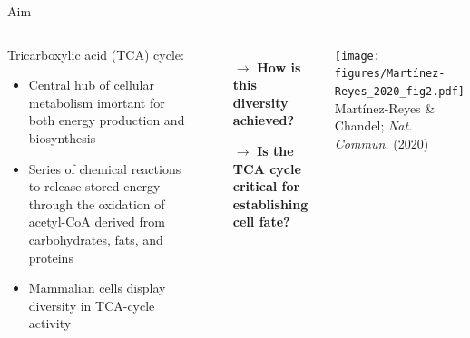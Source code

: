 \documentclass[10pt, aspectratio=169]{beamer}
\begin{document}
\begin{frame}{Aim}
\begin{columns}

\begin{block}{\centering Tricarboxylic acid (TCA) cycle:}
\vspace{0.2cm}
    \begin{itemize}
        \item Central hub of cellular metabolism imortant for both energy production and biosynthesis \\[0.2cm]
        \item Series of chemical reactions to release stored energy through the oxidation of acetyl-CoA derived from carbohydrates, fats, and proteins\\[0.2cm]
        \item Mammalian cells display diversity in TCA-cycle activity \\[0.2cm]
    \end{itemize}
\vspace{0.2cm}
\end{block}

\vspace{0.3cm}

\pause
\begin{itemize}
    \item[$\rightarrow$] \textbf{How is this diversity achieved?} \\[0.3cm]
    \item[$\rightarrow$] \textbf{Is the TCA cycle critical for establishing cell fate?}
\end{itemize}

\onslide
\centering
\texttt{[image: figures/Martínez-Reyes\_2020\_fig2.pdf]}\\[0.1cm]
\tiny{Martínez-Reyes \& Chandel; \textit{Nat. Commun.} (2020)}
\end{columns}
\end{frame}
\end{document}
